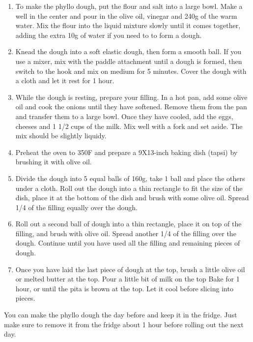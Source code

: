 \begin{enumerate}
    \item To make the phyllo dough, put the flour and salt into a large bowl. Make a well in the center and pour in the olive oil, vinegar and 240g of the warm water. Mix the flour into the liquid mixture slowly until it comes together, adding the extra 10g of water if you need to to form a dough.
    \item Knead the dough into a soft elastic dough, then form a smooth ball. If you use a mixer, mix with the paddle attachment until a dough is formed, then switch to the hook and mix on medium for 5 minutes. Cover the dough with a cloth and let it rest for 1 hour.
    \item While the dough is resting, prepare your filling. In a hot pan, add some olive oil and cook the onions until they have softened. Remove them from the pan and transfer them to a large bowl. Once they have cooled, add the eggs, cheeses and 1 1/2 cups of the milk. Mix well with a fork and set aside. The mix should be slightly liquidy.
    \item Preheat the oven to 350\degree F and prepare a 9X13-inch baking dish (tapsi) by brushing it with olive oil.
    \item Divide the dough into 5 equal balls of 160g, take 1 ball and place the others under a cloth. Roll out the dough into a thin rectangle to fit the size of the dish, place it at the bottom of the dish and brush with some olive oil. Spread 1/4 of the filling equally over the dough.
    \item Roll out a second ball of dough into a thin rectangle, place it on top of the filling, and brush with olive oil. Spread another 1/4 of the filling over the dough. Continue until you have used all the filling and remaining pieces of dough.
    \item Once you have laid the last piece of dough at the top, brush a little olive oil or melted butter at the top. Pour a little bit of milk on the top
    Bake for 1 hour, or until the pita is brown at the top. Let it cool before slicing into pieces.
\end{enumerate}

You can make the phyllo dough the day before and keep it in the fridge. Just make sure to remove it from the fridge about 1 hour before rolling out the next day.


